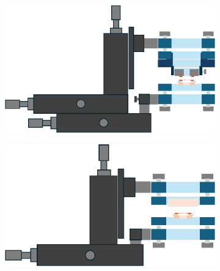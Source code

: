 \begin{figure}[h!]
    \centering
    \begin{subfigure}[b]{0.49\textwidth}
        \includegraphics[width=\textwidth]{figures/double_fano_sketch_discussion.pdf}
        \caption{}
        \label{fig:double_fano_discussion}
    \end{subfigure}
    \begin{subfigure}[b]{0.49\textwidth}
        \includegraphics[width=\textwidth]{figures/single_fano_sketch_discussion.pdf}
        \caption{}
        \label{fig:single_fano_discussion}
    \end{subfigure}
    \caption{}
    \label{fig:single_vs_double_sketch}
\end{figure}

